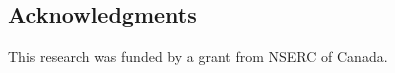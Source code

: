 \documentclass[../main.tex]{subfiles}
\begin{document}
\begin{refsection}
%
%
%

\subsection*{Acknowledgments}

This research was funded by a grant from NSERC of Canada.

\printbibliography[heading=subbibintoc]
\end{refsection}
\end{document}
